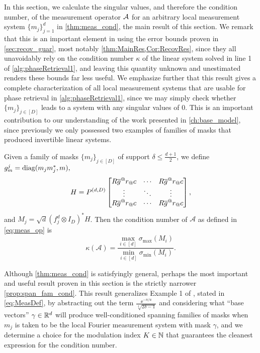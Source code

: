 In this section, we calculate the singular values, and therefore the condition number, of the measurement operator $\mathcal{A}$ for an arbitrary local measurement system $\{m_j\}_{j = 1}^d$ in \cref{thm:meas_cond}, the main result of this section.  We remark that this is an important element in using the error bounds proven in \cref{sec:recov_guar}, most notably \cref{thm:MainRes,Cor:RecovRes}, since they all unavoidably rely on the condition number $\kappa$ of the linear system solved in line 1 of \cref{alg:phaseRetrieval1}, and leaving this quantity unknown and unestimated renders these bounds far less useful.  We emphasize further that this result gives a complete characterization of all local measurement systems that are usable for phase retrieval in \cref{alg:phaseRetrieval1}, since we may simply check whether $\{m_j\}_{j \in [D]}$ leads to a system with any singular values of $0$.  This is an important contribution to our understanding of the work presented in \cref{ch:base_model}, since previously we only possessed two examples of families of masks that produced invertible linear systems.

\begin{theorem}
  Given a family of masks $\{m_j\}_{j \in [D]}$ of support $\delta \le \frac{d + 1}{2}$, we define $g_m^j = \operatorname{diag}(m_j m_j^*, m),$ \[H = P^{(d, D)} \cornmatfun{R \conj{g}^@r_@c}{1}{D}{1 - \delta}{\delta - 1}%
  ,\] and $M_j = \sqrt{d}\left(f_j^d \otimes I_D\right)^* H$.  Then the condition number of $\mathcal{A}$ as defined in \eqref{eq:meas_op} is \[\kappa(\mathcal{A}) = \dfrac{\max\limits_{i \in [d]} \sigma_{\max} (M_i)}{\min\limits_{i \in [d]} \sigma_{\min} (M_i)}.\] \label{prop:meas_cond} \label{thm:meas_cond}
\end{theorem}

Although \cref{thm:meas_cond} is satisfyingly general, perhaps the most important and useful result proven in this section is the strictly narrower \cref{prop:span_fam_cond}.  This result generalizes Example 1 of , stated in \eqref{eq:MeasDef}, by abstracting out the term $\frac{\ee^{-n/a}}{\sqrt[4]{2\delta -1}}$ and considering what ``base vectors'' $\gamma \in \mathbb{R}^d$ will produce well-conditioned spanning families of masks when $m_j$ is taken to be the local Fourier measurement system with mask $\gamma$, and we determine a choice for the modulation index $K \in \mathbb{N}$ that guarantees the cleanest expression for the condition number.  

